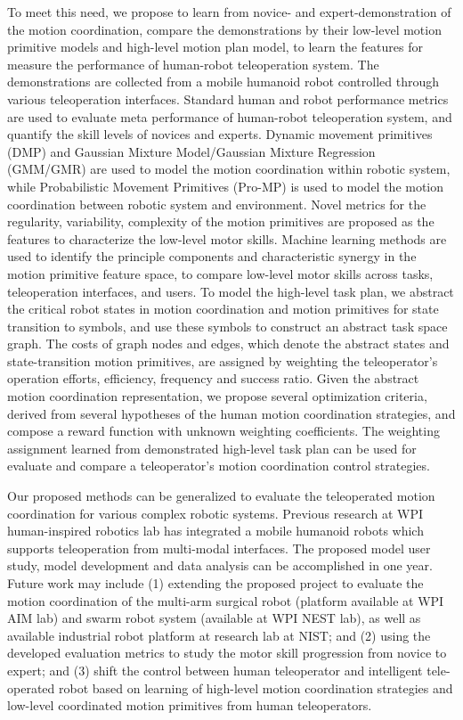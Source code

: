 
To meet this need, we propose to learn from novice- and expert-demonstration of the motion coordination, compare the demonstrations by their low-level motion primitive models and high-level motion plan model, to learn the features for measure the performance of human-robot teleoperation system. The demonstrations are collected from a mobile humanoid robot controlled through various teleoperation interfaces. Standard human and robot performance metrics are used to evaluate meta performance of human-robot teleoperation system, and quantify the skill levels of novices and experts. Dynamic movement primitives (DMP) and Gaussian Mixture Model/Gaussian Mixture Regression (GMM/GMR) are used to model the motion coordination within robotic system, while Probabilistic Movement Primitives (Pro-MP) is used to model the motion coordination between robotic system and environment. Novel metrics for the regularity, variability, complexity of the motion primitives are proposed as the features to characterize the low-level motor skills. Machine learning methods are used to identify the principle components and characteristic synergy in the motion primitive feature space, to compare low-level motor skills across tasks, teleoperation interfaces, and users. To model the high-level task plan, we abstract the critical robot states in motion coordination  and motion primitives for state transition to symbols, and use these symbols to construct an abstract task space graph. The costs of graph nodes and edges, which denote the abstract states and state-transition motion primitives, are assigned by weighting the teleoperator's operation efforts, efficiency, frequency and success ratio. Given the abstract motion coordination representation, we propose several optimization criteria, derived from several hypotheses of the human motion coordination strategies, and compose a reward function with unknown weighting coefficients. The weighting assignment learned from demonstrated high-level task plan can be used for evaluate and compare a teleoperator's motion coordination control strategies. 

Our proposed methods can be generalized to evaluate the teleoperated motion coordination for various complex robotic systems. Previous research at WPI human-inspired robotics lab has integrated a mobile humanoid robots which supports teleoperation from multi-modal interfaces. The proposed model user study, model development and data analysis can be accomplished in one year. Future work may include (1) extending the proposed project to evaluate the motion coordination of the multi-arm surgical robot (platform available at WPI AIM lab) and swarm robot system (available at WPI NEST lab), as well as available industrial robot platform at research lab at NIST; and (2) using the developed evaluation metrics to study the motor skill progression from novice to expert; and (3) shift the control between human teleoperator and intelligent tele-operated robot based on learning of high-level motion coordination strategies and low-level coordinated motion primitives from human teleoperators. 






